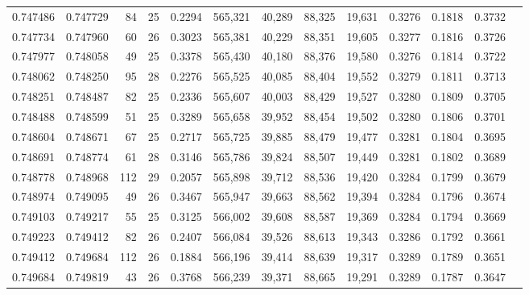 \begin{tabular}{rrrrrrrrrrrrr}
0.747486 & 0.747729 &    84 &  25 &                                     0.2294 & 565,321 &  40,289 &  88,325 &  19,631 & 0.3276 & 0.1818 & 0.3732 \\
0.747734 & 0.747960 &    60 &  26 &                                     0.3023 & 565,381 &  40,229 &  88,351 &  19,605 & 0.3277 & 0.1816 & 0.3726 \\
0.747977 & 0.748058 &    49 &  25 &                                     0.3378 & 565,430 &  40,180 &  88,376 &  19,580 & 0.3276 & 0.1814 & 0.3722 \\
0.748062 & 0.748250 &    95 &  28 &                                     0.2276 & 565,525 &  40,085 &  88,404 &  19,552 & 0.3279 & 0.1811 & 0.3713 \\
0.748251 & 0.748487 &    82 &  25 &                                     0.2336 & 565,607 &  40,003 &  88,429 &  19,527 & 0.3280 & 0.1809 & 0.3705 \\
0.748488 & 0.748599 &    51 &  25 &                                     0.3289 & 565,658 &  39,952 &  88,454 &  19,502 & 0.3280 & 0.1806 & 0.3701 \\
0.748604 & 0.748671 &    67 &  25 &                                     0.2717 & 565,725 &  39,885 &  88,479 &  19,477 & 0.3281 & 0.1804 & 0.3695 \\
0.748691 & 0.748774 &    61 &  28 &                                     0.3146 & 565,786 &  39,824 &  88,507 &  19,449 & 0.3281 & 0.1802 & 0.3689 \\
0.748778 & 0.748968 &   112 &  29 &                                     0.2057 & 565,898 &  39,712 &  88,536 &  19,420 & 0.3284 & 0.1799 & 0.3679 \\
0.748974 & 0.749095 &    49 &  26 &                                     0.3467 & 565,947 &  39,663 &  88,562 &  19,394 & 0.3284 & 0.1796 & 0.3674 \\
0.749103 & 0.749217 &    55 &  25 &                                     0.3125 & 566,002 &  39,608 &  88,587 &  19,369 & 0.3284 & 0.1794 & 0.3669 \\
0.749223 & 0.749412 &    82 &  26 &                                     0.2407 & 566,084 &  39,526 &  88,613 &  19,343 & 0.3286 & 0.1792 & 0.3661 \\
0.749412 & 0.749684 &   112 &  26 &                                     0.1884 & 566,196 &  39,414 &  88,639 &  19,317 & 0.3289 & 0.1789 & 0.3651 \\
0.749684 & 0.749819 &    43 &  26 &                                     0.3768 & 566,239 &  39,371 &  88,665 &  19,291 & 0.3289 & 0.1787 & 0.3647 \\

\end{tabular}
